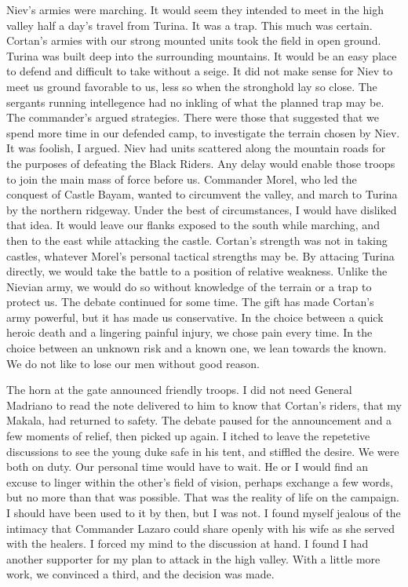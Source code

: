 \documentclass{article}
\begin{document}
Niev's armies were marching. It would seem they intended to meet in the high valley half a day's travel from Turina. It was a trap. This much was certain. Cortan's armies with our strong mounted units took the field in open ground. Turina was built deep into the surrounding mountains. It would be an easy place to defend and difficult to take without a seige. It did not make sense for Niev to meet us ground favorable to us, less so when the stronghold lay so close. The sergants running intellegence had no inkling of what the planned trap may be. The commander's argued strategies. There were those that suggested that we spend more time in our defended camp, to investigate the terrain chosen by Niev. It was foolish, I argued. Niev had units scattered along the mountain roads for the purposes of defeating the Black Riders. Any delay would enable those troops to join the main mass of force before us. Commander Morel, who led the conquest of Castle Bayam, wanted to circumvent the valley, and march to Turina by the northern ridgeway. Under the best of circumstances, I would have disliked that idea. It would leave our flanks exposed to the south while marching, and then to the east while attacking the castle. Cortan's strength was not in taking castles, whatever Morel's personal tactical strengths may be. By attacing Turina directly, we would take the battle to a position of relative weakness. Unlike the Nievian army, we would do so without knowledge of the terrain or a trap to protect us. The debate continued for some time. The gift has made Cortan's army powerful, but it has made us conservative. In the choice between a quick heroic death and a lingering painful injury, we chose pain every time. In the choice between an unknown risk and a known one, we lean towards the known. We do not like to lose our men without good reason. 

The horn at the gate announced friendly troops. I did not need General Madriano to read the note delivered to him to know that Cortan's riders, that my Makala, had returned to safety. The debate paused for the announcement and a few moments of relief, then picked up again. I itched to leave the repetetive discussions to see the young duke safe in his tent, and stiffled the desire. We were both on duty. Our personal time would have to wait. He or I would find an excuse to linger within the other's field of vision, perhaps exchange a few words, but no more than that was possible. That was the reality of life on the campaign. I should have been used to it by then, but I was not. I found myself jealous of the intimacy that Commander Lazaro could share openly with his wife as she served with the healers. I forced my mind to the discussion at hand. I found I had another supporter for my plan to attack in the high valley. With a little more work, we convinced a third, and the decision was made.
\end{document}
